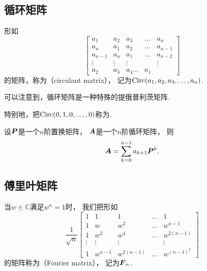 \subsection{循环矩阵}
形如\begin{equation*}
	\begin{bmatrix}
		a_1 & a_2 & a_3 & \dots & a_n \\
		a_n & a_1 & a_2 & \dots & a_{n-1} \\
		a_{n-1} & a_n & a_1 & \dots & a_{n-2} \\
		\vdots & \vdots & \vdots & & \vdots \\
		a_2 & a_3 & a_4 \dots & a_1
	\end{bmatrix}
\end{equation*}
的矩阵，称为（circulant matrix），
记为\(\operatorname{Circ}(a_1,a_2,a_3,\dotsc,a_n)\).


可以注意到，循环矩阵是一种特殊的提俄普利茨矩阵.

特别地，把\(\operatorname{Circ}(0,1,0,\dotsc,0)\)称为.

\begin{proposition}
设\(\boldsymbol{P}\)是一个\(n\)阶置换矩阵，
\(\boldsymbol{A}\)是一个\(n\)阶循环矩阵，
则\begin{equation*}
	\boldsymbol{A} = \sum_{k=0}^{n-1} a_{k+1} \boldsymbol{P}^k.
\end{equation*}
\end{proposition}

\subsection{傅里叶矩阵}
当\(w \in \mathbb{C}\)满足\(w^n = 1\)时，
我们把形如\begin{equation*}
	\frac1{\sqrt{n}}
	\begin{bmatrix}
		1 & 1 & 1 & \dots & 1 \\
		1 & w & w^2 & \dots & w^{n-1} \\
		1 & w^2 & w^4 & \dots & w^{2(n-1)} \\
		\vdots & \vdots & \vdots & & \vdots \\
		1 & w^{n-1} & w^{2(n-1)} & \dots & w^{(n-1)^2}
	\end{bmatrix}
\end{equation*}
的矩阵称为（Fourier matrix），
记为\(\boldsymbol{F}_n\).

